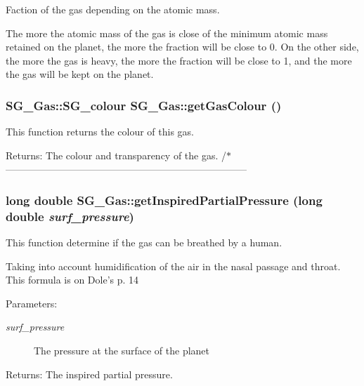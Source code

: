 Faction of the gas depending on the atomic mass. 

The more the atomic mass of the gas is close of the minimum atomic mass retained on the planet, the more the fraction will be close to 0. On the other side, the more the gas is heavy, the more the fraction will be close to 1, and the more the gas will be kept on the planet. 
\subsubsection{\setlength{\rightskip}{0pt plus 5cm}SG\_\-Gas::SG\_\-colour SG\_\-Gas::get\-Gas\-Colour ()}\label{class_s_g___gas_a24}


This function returns the colour of this gas. 

\begin{Desc}
\item[Returns:]The colour and transparency of the gas. /$\ast$-------------------------------------------------------------------------- \end{Desc}
\subsubsection{\setlength{\rightskip}{0pt plus 5cm}long double SG\_\-Gas::get\-Inspired\-Partial\-Pressure (long double {\em surf\_\-pressure})}\label{class_s_g___gas_a18}


This function determine if the gas can be breathed by a human. 

Taking into account humidification of the air in the nasal passage and throat. This formula is on Dole's p. 14 \begin{Desc}
\item[Parameters:]
\begin{description}
\item[{\em surf\_\-pressure}]The pressure at the surface of the planet \end{description}
\end{Desc}
\begin{Desc}
\item[Returns:]The inspired partial pressure. \end{Desc}
